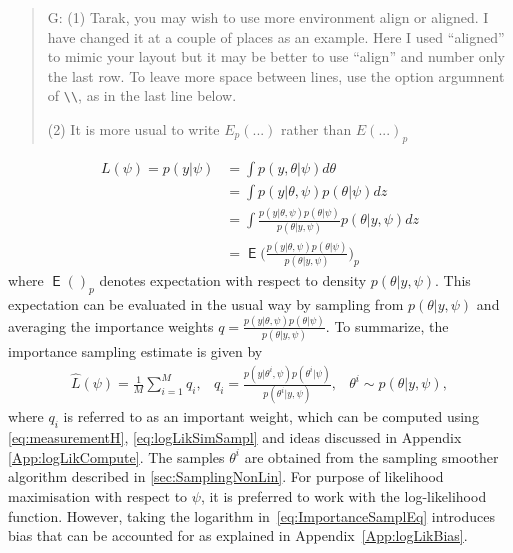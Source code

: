 \documentclass{article}
\DeclareMathOperator{\E}{\mathsf{E}}
\newenvironment{comment}{%
  \begin{quote}\color{red}\begin{sffamily}}
 {\end{sffamily}\color{black}\end{quote}}
\begin{document}
%
\begin{comment}
  G: (1) Tarak, you may wish to use more environment align or aligned. I have changed it at a
  couple of places as an example. Here I used ``aligned'' to mimic your layout but it may be
  better to use ``align'' and number only the last row. To leave more space between lines,
  use the option argumnent of \verb+\\+, as in the last line below.

  (2) It is more usual to write $E_{p}(...)$ rather than $E(...)_{p}$
\end{comment}
\begin{equation}\label{eq:logLikPsiImpotance}
\begin{aligned}
  L(\psi)
      = p(y|\psi)
     &= \int p(y,\theta|\psi)d\theta
  \\ &= \int p(y|\theta,\psi) p(\theta|\psi)dz
  \\ &= \int \frac{p(y|\theta,\psi) p(\theta|\psi)}{p(\theta|y,\psi)} p(\theta|y,\psi) dz
  \\[5pt] &= \E \Big ( \frac{p(y|\theta,\psi) p(\theta|\psi)}{p(\theta|y,\psi)} \Big )_p
\end{aligned}
\end{equation}
where $\E ()_p$ denotes expectation with respect to density $p(\theta|y,\psi)$. This
expectation can be evaluated in the usual way by sampling from $p(\theta|y,\psi)$ and
averaging the importance weights
$q=\frac{p(y|\theta,\psi) p(\theta|\psi)}{p(\theta|y,\psi)}$. To summarize, the importance
sampling estimate is given by
\begin{equation}
  \begin{array}{rcl}
   \hat{L}(\psi) = \frac{1}{M} \displaystyle \sum_{i=1}^M q_i, & q_i=\frac{p(y|\theta^i,\psi) p(\theta^i|\psi)}{p(\theta^i|y,\psi)}, & \theta^i \sim p(\theta|y,\psi),
   \end{array}
   \label{eq:ImportanceSamplEq}
\end{equation}
where $q_i$ is referred to as an important weight, which can be computed using
\eqref{eq:measurementH}, \eqref{eq:logLikSimSampl} and ideas discussed in Appendix
\ref{App:logLikCompute}. The samples $\theta^i$ are obtained from the sampling smoother
algorithm described in \ref{sec:SamplingNonLin}. For purpose of likelihood maximisation with
respect to $\psi$, it is preferred to work with the log-likelihood function. However, taking
the logarithm in~\eqref{eq:ImportanceSamplEq} introduces bias that can be accounted for as
explained in Appendix~\ref{App:logLikBias}.
\end{document}
